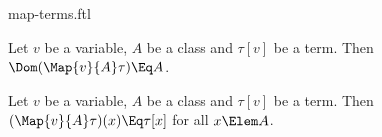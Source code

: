 \documentclass{stex}
\begin{document}
\begin{smodule}{map-terms.ftl}


\begin{fakeforthel}
  \begin{axiom*}
    Let $v$ be a variable, $A$ be a class and $\tau[v]$ be a term.
    Then $\Dom(\Map{v}{A}\tau) \Eq A$.
  \end{axiom*}
\end{fakeforthel}

\begin{fakeforthel}
  \begin{axiom*}
    Let $v$ be a variable, $A$ be a class and $\tau[v]$ be a term.
    Then $(\Map{v}{A}\tau)(x) \Eq \tau[x]$ for all $x \Elem A$.
  \end{axiom*}
\end{fakeforthel}

\end{smodule}
\end{document}
